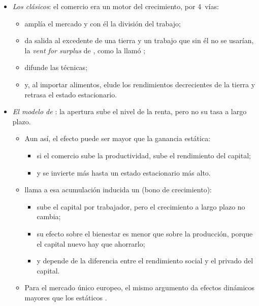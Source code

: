 \documentclass[11pt]{article}
\begin{document}
\begin{itemize}
\item \emph{Los clásicos}: el comercio era un motor del crecimiento, por 4~vías:
  \begin{itemize}
  \item amplía el mercado y con él la división del trabajo\nocite{Smith1776Wealth};
  \item da salida al excedente de una tierra y un trabajo que sin él no se usarían, la \emph{vent for surplus} de , como la llamó \textcite{Myint1958Classical};
  \item difunde las técnicas;
  \item y, al importar alimentos, elude los rendimientos decrecientes de la tierra y retrasa el estado estacionario\nocite{Ricardo1817Principles}.
  \end{itemize}
\item \emph{El modelo de } : la apertura sube el nivel de la renta, pero no su tasa a largo plazo.
  \begin{itemize}
  \item Aun así, el efecto puede ser mayor que la ganancia estática:
    \begin{itemize}
    \item si el comercio sube la productividad, sube el rendimiento del capital;
    \item y se invierte más hasta un estado estacionario más alto.
    \end{itemize}
  \item \textcite{Baldwin1992Measurable} llama a esa acumulación inducida un  (bono de crecimiento):
    \begin{itemize}
    \item sube el capital por trabajador, pero el crecimiento a largo plazo no cambia;
    \item su efecto sobre el bienestar es menor que sobre la producción, porque el capital nuevo hay que ahorrarlo;
    \item y depende de la diferencia entre el rendimiento social y el privado del capital.
    \end{itemize}
  \item Para el mercado único europeo, el mismo argumento da efectos dinámicos mayores que los estáticos\nocite{Baldwin1989Growth} .
  \end{itemize}
\end{itemize}
\end{document}
